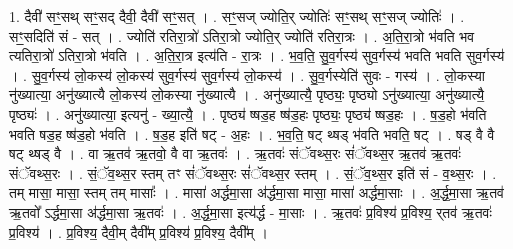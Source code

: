 \documentclass[17pt]{extarticle}
\begin{document}
1. दैवी॑ सꣳ॒॒सथ् सꣳ॒॒सद् दैवी॒ दैवी॑ सꣳ॒॒सत् । . सꣳ॒॒सज् ज्योति॒र् ज्योतिः॑ सꣳ॒॒सथ् सꣳ॒॒सज् ज्योतिः॑ । . सꣳ॒॒सदिति॑ सं - सत् । . ज्योति॑ रतिरा॒त्रो॑ ऽतिरा॒त्रो ज्योति॒र् ज्योति॑ रतिरा॒त्रः । . अ॒ति॒रा॒त्रो भ॑वति भव त्यतिरा॒त्रो॑ ऽतिरा॒त्रो भ॑वति । . अ॒ति॒रा॒त्र इत्य॑ति - रा॒त्रः । . भ॒व॒ति॒ सु॒व॒र्गस्य॑ सुव॒र्गस्य॑ भवति भवति सुव॒र्गस्य॑ । . सु॒व॒र्गस्य॑ लो॒कस्य॑ लो॒कस्य॑ सुव॒र्गस्य॑ सुव॒र्गस्य॑ लो॒कस्य॑ । . सु॒व॒र्गस्येति॑ सुवः - गस्य॑ । . लो॒कस्या नु॑ख्यात्या॒ अनु॑ख्यात्यै लो॒कस्य॑ लो॒कस्या नु॑ख्यात्यै । . अनु॑ख्यात्यै॒ पृष्ठ्यः॒ पृष्ठ्यो ऽनु॑ख्यात्या॒ अनु॑ख्यात्यै॒ पृष्ठ्यः॑ । . अनु॑ख्यात्या॒ इत्यनु॑ - ख्या॒त्यै॒ । . पृष्ठ्य॑ ष्षड॒ह ष्ष॑ड॒हः पृष्ठ्यः॒ पृष्ठ्य॑ ष्षड॒हः । . ष॒ड॒हो भ॑वति भवति षड॒ह ष्ष॑ड॒हो भ॑वति । . ष॒ड॒ह इति॑ षट् - अ॒हः । . भ॒व॒ति॒ षट् थ्षड् भ॑वति भवति॒ षट् । . षड् वै वै षट् थ्षड् वै । . वा ऋ॒तव॑ ऋ॒तवो॒ वै वा ऋ॒तवः॑ । . ऋ॒तवः॑ संॅवथ्स॒रः सं॑ॅवथ्स॒र ऋ॒तव॑ ऋ॒तवः॑ संॅवथ्स॒रः । . सं॒ॅव॒थ्स॒र स्तम् तꣳ सं॑ॅवथ्स॒रः सं॑ॅवथ्स॒र स्तम् । . सं॒ॅव॒थ्स॒र इति॑ सं - व॒थ्स॒रः । . तम् मासा॒ मासा॒ स्तम् तम् मासाः᳚ । . मासा॑ अर्द्धमा॒सा अ॑र्द्धमा॒सा मासा॒ मासा॑ अर्द्धमा॒साः । . अ॒र्द्ध॒मा॒सा ऋ॒तव॑ ऋ॒तवो᳚ ऽर्द्धमा॒सा अ॑र्द्धमा॒सा ऋ॒तवः॑ । . अ॒र्द्ध॒मा॒सा इत्य॑र्द्ध - मा॒साः । . ऋ॒तवः॑ प्र॒विश्य॑ प्र॒विश्य॒ र्‌तव॑ ऋ॒तवः॑ प्र॒विश्य॑ । . प्र॒विश्य॒ दैवी॒म् दैवी᳚म् प्र॒विश्य॑ प्र॒विश्य॒ दैवी᳚म् । \newline
\end{document}
